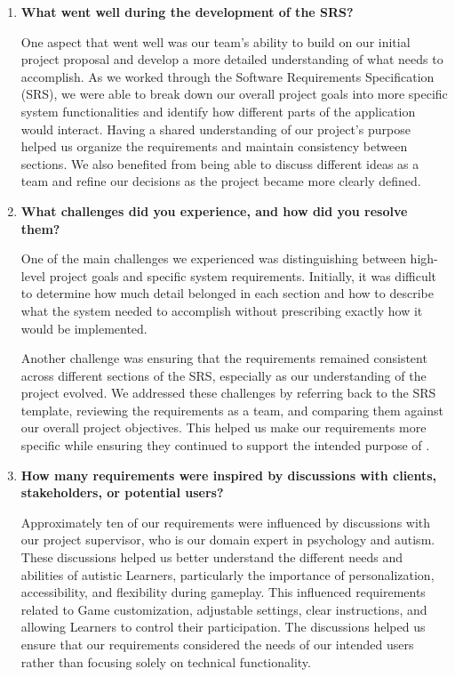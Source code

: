 \documentclass[12pt]{article}
\begin{document}
\begin{enumerate}

\item \textbf{What went well during the development of the SRS?}

One aspect that went well was our team's ability to build on our initial project
proposal and develop a more detailed understanding of what \progname{} needs to
accomplish. As we worked through the Software Requirements Specification (SRS),
we were able to break down our overall project goals into more specific system
functionalities and identify how different parts of the application would
interact. Having a shared understanding of our project's purpose helped us
organize the requirements and maintain consistency between sections. We also
benefited from being able to discuss different ideas as a team and refine our
decisions as the project became more clearly defined.

\item \textbf{What challenges did you experience, and how did you resolve them?}

One of the main challenges we experienced was distinguishing between high-level
project goals and specific system requirements. Initially, it was difficult to
determine how much detail belonged in each section and how to describe what the
system needed to accomplish without prescribing exactly how it would be
implemented.

Another challenge was ensuring that the requirements remained consistent across
different sections of the SRS, especially as our understanding of the project
evolved. We addressed these challenges by referring back to the SRS template,
reviewing the requirements as a team, and comparing them against our overall
project objectives. This helped us make our requirements more specific while
ensuring they continued to support the intended purpose of \progname{}.

\item \textbf{How many requirements were inspired by discussions with clients,
stakeholders, or potential users?}

Approximately ten of our requirements were influenced by discussions with our
project supervisor, who is our domain expert in psychology and autism. These
discussions helped us better understand the different needs and abilities of
autistic Learners, particularly the importance of personalization,
accessibility, and flexibility during gameplay. This influenced requirements
related to Game customization, adjustable settings, clear instructions, and
allowing Learners to control their participation. The discussions helped us
ensure that our requirements considered the needs of our intended users rather
than focusing solely on technical functionality.


\end{enumerate}
\end{document}
